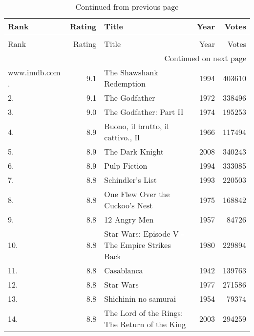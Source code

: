 {
\begin{longtable}[c]{lrXrr}
\caption{\texttt{type=longtable}\label{tbl:longtable}}\\
\toprule
Rank & Rating & Title & Year & Votes \\
\midrule
\endfirsthead
\caption[]{Continued from previous page}\\

\toprule
Rank & Rating & Title & Year & Votes \\
\midrule
\endhead
\midrule
\multicolumn{5}{r}{{Continued on next page}} \\
\bottomrule
\endfoot
\tiny{www.imdb.com}
\endlastfoot
1.  & 9.1 & The Shawshank Redemption                                             & 1994 & 403610 \\
2.  & 9.1 & The Godfather                                                        & 1972 & 338496 \\
3.  & 9.0 & The Godfather: Part II                                               & 1974 & 195253 \\
4.  & 8.9 & Buono, il brutto, il cattivo., Il                                    & 1966 & 117494 \\
5.  & 8.9 & The Dark Knight                                                      & 2008 & 340243 \\
6.  & 8.9 & Pulp Fiction                                                         & 1994 & 333085 \\
7.  & 8.8 & Schindler's List                                                     & 1993 & 220503 \\
8.  & 8.8 & One Flew Over the Cuckoo's Nest                                      & 1975 & 168842 \\
9.  & 8.8 & 12 Angry Men                                                         & 1957 & 84726  \\
10. & 8.8 & Star Wars: Episode V - The Empire Strikes Back                       & 1980 & 229894 \\
11. & 8.8 & Casablanca                                                           & 1942 & 139763 \\
12. & 8.8 & Star Wars                                                            & 1977 & 271586 \\
13. & 8.8 & Shichinin no samurai                                                 & 1954 & 79374  \\
14. & 8.8 & The Lord of the Rings: The Return of the King                        & 2003 & 294259 \\

\end{longtable}}
